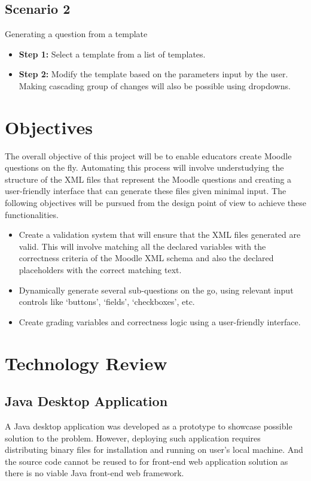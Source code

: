 \documentclass[a4paper, 12pt]{article}
\begin{document}
\subsection{Scenario 2} Generating a question from a template
\begin{itemize}    
    \item \textbf{Step 1:} Select a template from a list of templates. 
    \item \textbf{Step 2:} Modify the template based on the parameters input by the user. Making cascading group of changes will also be possible
    using dropdowns.
\end{itemize}

\section{Objectives}
The overall objective of this project will be to enable educators create Moodle questions on the fly. Automating this process will involve understudying
the structure of the XML files that represent the Moodle questions and creating a user-friendly interface that can generate these files given minimal input.
The following objectives will be pursued from the design point of view to achieve these functionalities.

\begin{itemize}
    \item Create a validation system that will ensure that the XML files generated are valid. This will involve matching all the declared variables with 
    the correctness criteria of the Moodle XML schema and also the declared placeholders with the correct matching text.
    \item Dynamically generate several sub-questions on the go, using relevant input controls like `buttons', `fields', `checkboxes', etc. 
    \item Create grading variables and correctness logic using a user-friendly interface.
\end{itemize}

\section{Technology Review}
\subsection{Java Desktop Application} 
A Java desktop application was developed as a prototype to showcase possible solution to the problem. However, deploying such application requires 
distributing binary files for installation and running on user's local machine. And the source code cannot be reused to for front-end web application 
solution as there is no viable Java front-end web framework. 
\end{document}
